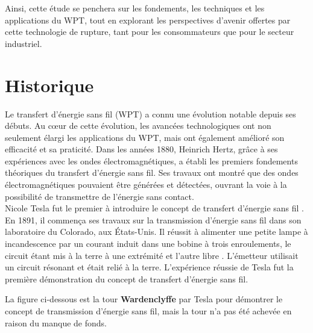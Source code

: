 \documentclass[12pt,a4paper,titlepage,notitlepage]{article}
\begin{document}
	
	Ainsi, cette étude se penchera sur les fondements, les techniques et les applications du WPT, tout en explorant les perspectives d'avenir offertes par cette technologie de rupture, tant pour les consommateurs que pour le secteur industriel.
	
	
	\newpage
	\section{Historique}
	\vspace{1cm}
	Le transfert d'énergie sans fil (WPT) a connu une évolution notable depuis ses débuts. Au cœur de cette évolution, les avancées technologiques ont non seulement élargi les applications du WPT, mais ont également amélioré son efficacité et sa praticité. Dans les années 1880, Heinrich Hertz, grâce à ses expériences avec les ondes électromagnétiques, a établi les premiers fondements théoriques du transfert d'énergie sans fil. Ses travaux ont montré que des ondes électromagnétiques pouvaient être générées et détectées, ouvrant la voie à la possibilité de transmettre de l'énergie sans contact.\\
	
	Nicole Tesla fut le premier à introduire le concept de transfert d'énergie
	sans fil . En 1891, il commença ses travaux sur la transmission d'énergie
	sans fil dans son laboratoire du Colorado, aux États-Unis. Il réussit à
	alimenter une petite lampe à incandescence par un courant induit dans une
	bobine à trois enroulements, le circuit étant mis à la terre à une extrémité et
	l'autre libre . L'émetteur utilisait un circuit résonant et était relié à la terre.
	L'expérience réussie de Tesla fut la première démonstration du concept de
	transfert d'énergie sans fil.
	
	La figure ci-dessous est la tour \textbf{Wardenclyffe} par Tesla pour démontrer le concept de transmission d'énergie sans fil, mais la tour n'a pas été achevée en raison du manque de fonds.
	
\end{document}
